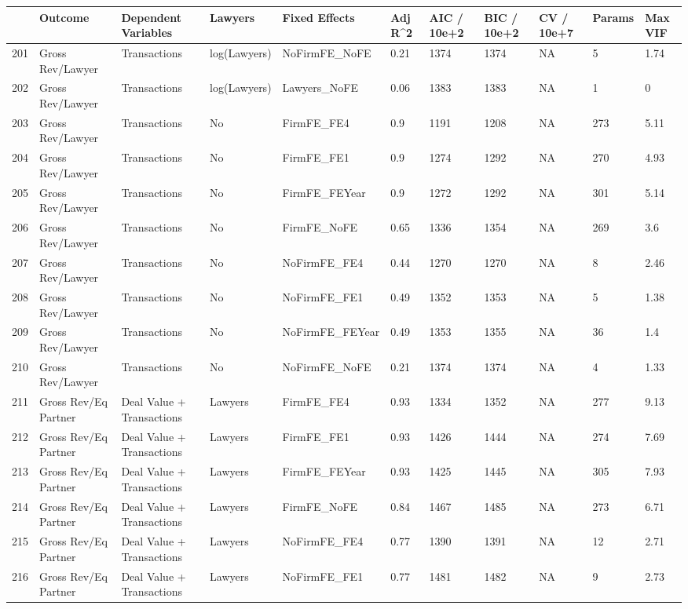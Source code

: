 \documentclass{article}
\begin{document}
\begin{table}[H]
\centering
\begin{tabular}{rllllllllll}
  \hline
 & Outcome & Dependent Variables & Lawyers & Fixed Effects & Adj R^2 & AIC / 10e+2 & BIC / 10e+2 & CV / 10e+7 & Params & Max VIF \\ 
  \hline
201 & Gross Rev/Lawyer & Transactions & log(Lawyers) & NoFirmFE\_NoFE & 0.21 & 1374 & 1374 & NA & 5 & 1.74 \\ 
  202 & Gross Rev/Lawyer & Transactions & log(Lawyers) & Lawyers\_NoFE & 0.06 & 1383 & 1383 & NA & 1 & 0 \\ 
  203 & Gross Rev/Lawyer & Transactions & No & FirmFE\_FE4 & 0.9 & 1191 & 1208 & NA & 273 & 5.11 \\ 
  204 & Gross Rev/Lawyer & Transactions & No & FirmFE\_FE1 & 0.9 & 1274 & 1292 & NA & 270 & 4.93 \\ 
  205 & Gross Rev/Lawyer & Transactions & No & FirmFE\_FEYear & 0.9 & 1272 & 1292 & NA & 301 & 5.14 \\ 
  206 & Gross Rev/Lawyer & Transactions & No & FirmFE\_NoFE & 0.65 & 1336 & 1354 & NA & 269 & 3.6 \\ 
  207 & Gross Rev/Lawyer & Transactions & No & NoFirmFE\_FE4 & 0.44 & 1270 & 1270 & NA & 8 & 2.46 \\ 
  208 & Gross Rev/Lawyer & Transactions & No & NoFirmFE\_FE1 & 0.49 & 1352 & 1353 & NA & 5 & 1.38 \\ 
  209 & Gross Rev/Lawyer & Transactions & No & NoFirmFE\_FEYear & 0.49 & 1353 & 1355 & NA & 36 & 1.4 \\ 
  210 & Gross Rev/Lawyer & Transactions & No & NoFirmFE\_NoFE & 0.21 & 1374 & 1374 & NA & 4 & 1.33 \\ 
  211 & Gross Rev/Eq Partner & Deal Value + Transactions & Lawyers & FirmFE\_FE4 & 0.93 & 1334 & 1352 & NA & 277 & 9.13 \\ 
  212 & Gross Rev/Eq Partner & Deal Value + Transactions & Lawyers & FirmFE\_FE1 & 0.93 & 1426 & 1444 & NA & 274 & 7.69 \\ 
  213 & Gross Rev/Eq Partner & Deal Value + Transactions & Lawyers & FirmFE\_FEYear & 0.93 & 1425 & 1445 & NA & 305 & 7.93 \\ 
  214 & Gross Rev/Eq Partner & Deal Value + Transactions & Lawyers & FirmFE\_NoFE & 0.84 & 1467 & 1485 & NA & 273 & 6.71 \\ 
  215 & Gross Rev/Eq Partner & Deal Value + Transactions & Lawyers & NoFirmFE\_FE4 & 0.77 & 1390 & 1391 & NA & 12 & 2.71 \\ 
  216 & Gross Rev/Eq Partner & Deal Value + Transactions & Lawyers & NoFirmFE\_FE1 & 0.77 & 1481 & 1482 & NA & 9 & 2.73 \\ 

\end{tabular}
\end{table}
\end{document}
